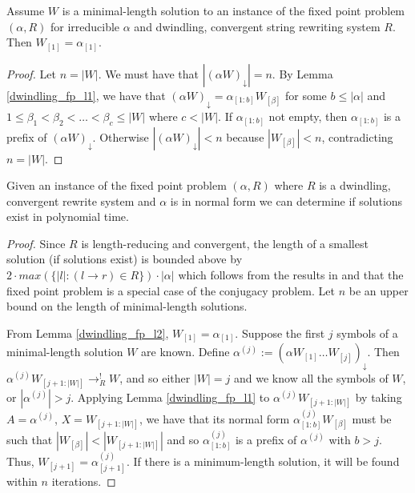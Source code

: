 \documentclass{lmcs} %
\theoremstyle{plain}\newtheorem{satz}[thm]{Satz} %
\begin{document}
\begin{lem} \label{dwindling_fp_l2}%
Assume $W$ is a minimal-length solution to an instance of the fixed point problem $(\alpha,R)$ for irreducible
$\alpha$ and dwindling, convergent string rewriting system $R$. Then
$W_{[1]} = \alpha_{[1]}$.
\end{lem}

\begin{proof}

Let $n=|W|$. We must have that $|(\alpha W)_\downarrow|=n$. By Lemma
\ref{dwindling_fp_l1}, we have that $(\alpha W)_\downarrow = \alpha_{[1:b]}W_{[\beta]}$ for
some $b\leq|\alpha|$ and $1\leq \beta_1 < \beta_2 < \dots < \beta_c
\leq |W|$ where $c < |W|$. If $\alpha_{[1:b]}$ not empty, then
$\alpha_{[1:b]}$ is a prefix of $(\alpha W)_\downarrow$. Otherwise
$|(\alpha W)_\downarrow| < n$ because $|W_{[\beta]}|<n$, contradicting
$n=|W|$.
\end{proof}



\begin{thm} \label{dwindling_fp_theorem1} Given an instance of the
fixed point problem $(\alpha,R)$ where $R$ is a dwindling, convergent
rewrite system and $\alpha$ is in normal form we can determine if
solutions exist in polynomial time.
\end{thm}

\begin{proof}

Since $R$ is length-reducing and convergent, the length of a smallest
solution (if solutions exist) is bounded above by $2\cdot max(\{|l| :
(l\rightarrow r) \in R \}) \cdot |\alpha|$ which follows from the
results in \cite{narendran1985complexity} and that the fixed point
problem is a special case of the conjugacy problem.  Let $n$ be an
upper bound on the length of minimal-length solutions.

From Lemma \ref{dwindling_fp_l2}, $W_{[1]}=\alpha_{[1]}$. Suppose the first $j$ symbols of a
minimal-length solution $W$ are known. Define $\alpha^{(j)} := (\alpha
W_{[1]} \dots W_{[j]})_\downarrow$. Then $\alpha^{(j)}W_{[j+1:|W|]}
\rightarrow_R^! W$, and so either $|W|=j$ and we know all the symbols
of $W$, or $|\alpha^{(j)}| > j$. Applying Lemma \ref{dwindling_fp_l1} to
$\alpha^{(j)}W_{[j+1:|W|]}$ by taking $A = \alpha^{(j)}$, $X =
 W_{[j+1:|W|]}$, we have that its normal form
$\alpha^{(j)}_{[1:b]}W_{[\beta]}$ must be such that $|W_{[\beta]}| <
|W_{[j+1:|W|]}|$ and so $\alpha^{(j)}_{[1:b]}$ is a prefix of
$\alpha^{(j)}$ with $b > j$. Thus, $W_{[j+1]} = \alpha^{(j)}_{[j+1]}$. If
there is a minimum-length solution, it will be found within $n$
iterations.
\end{proof}
\end{document}
